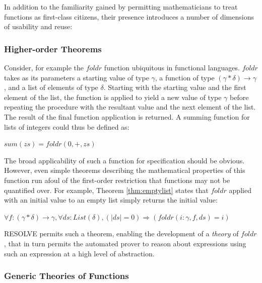 In addition to the familiarity gained by permitting mathematicians to treat functions as first-class citizens, their presence introduces a number of dimensions of usability and reuse:

		\subsubsection{Higher-order Theorems\label{higherOrderTheorems}}

Consider, for example the $foldr$ function ubiquitous in functional languages.  $foldr$ takes as its parameters a starting value of type $\gamma$, a function of type $(\gamma*\delta)\rightarrow\gamma$, and a list of elements of type $\delta$.  Starting with the starting value and the first element of the list, the function is applied to yield a new value of type $\gamma$ before repeating the procedure with the resultant value and the next element of the list.  The result of the final function application is returned.  A summing function for lists of integers could thus be defined as:

$sum(zs) = foldr(0, +, zs)$

The broad applicability of such a function for specification should be obvious.  However, even simple theorems describing the mathematical properties of this function run afoul of the first-order restriction that functions may not be quantified over.  For example, Theorem \ref{thm:emptylist} states that $foldr$ applied with an initial value to an empty list simply returns the initial value:

\begin{thm}
$\forall f : (\gamma*\delta)\rightarrow\gamma, \forall ds : List(\delta), (|ds| = 0) \Rightarrow (foldr(i : \gamma, f, ds) = i)$
\label{thm:emptylist}
\end{thm}

RESOLVE permits such a theorem, enabling the development of a \emph{theory} of $foldr$, that in turn permits the automated prover to reason about expressions using such an expression at a high level of abstraction.

		\subsubsection{Generic Theories of Functions\label{genericTheoriesFunctions}}

